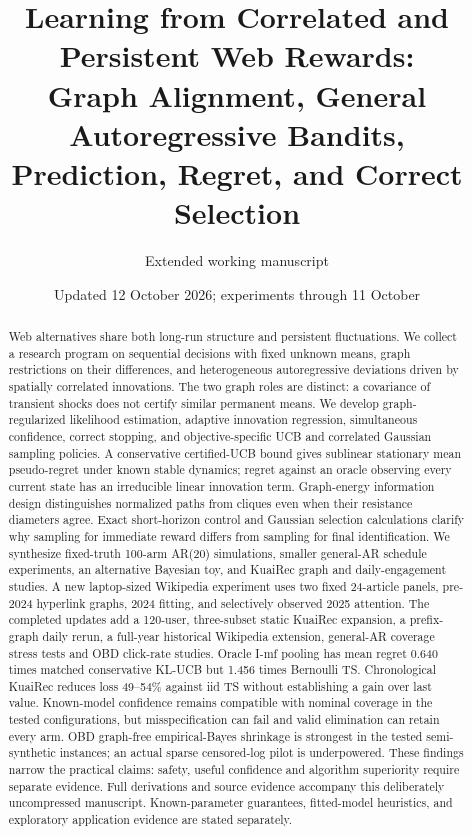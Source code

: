\documentclass[11pt]{article}
\title{Learning from Correlated and Persistent Web Rewards:\\Graph Alignment, General Autoregressive Bandits,\\Prediction, Regret, and Correct Selection}
\author{Extended working manuscript}
\date{Updated 12 October 2026; experiments through 11 October}
\begin{document}
\maketitle
\begin{abstract}
Web alternatives share both long-run structure and persistent fluctuations. We collect a research program on sequential decisions with fixed unknown means, graph restrictions on their differences, and heterogeneous autoregressive deviations driven by spatially correlated innovations. The two graph roles are distinct: a covariance of transient shocks does not certify similar permanent means. We develop graph-regularized likelihood estimation, adaptive innovation regression, simultaneous confidence, correct stopping, and objective-specific UCB and correlated Gaussian sampling policies. A conservative certified-UCB bound gives sublinear stationary mean pseudo-regret under known stable dynamics; regret against an oracle observing every current state has an irreducible linear innovation term. Graph-energy information design distinguishes normalized paths from cliques even when their resistance diameters agree. Exact short-horizon control and Gaussian selection calculations clarify why sampling for immediate reward differs from sampling for final identification. We synthesize fixed-truth 100-arm AR(20) simulations, smaller general-AR schedule experiments, an alternative Bayesian toy, and KuaiRec graph and daily-engagement studies. A new laptop-sized Wikipedia experiment uses two fixed 24-article panels, pre-2024 hyperlink graphs, 2024 fitting, and selectively observed 2025 attention.
The completed updates add a 120-user, three-subset static KuaiRec expansion, a prefix-graph daily rerun, a full-year historical Wikipedia extension, general-AR coverage stress tests and OBD click-rate studies. Oracle I-mf pooling has mean regret 0.640 times matched conservative KL-UCB but 1.456 times Bernoulli TS. Chronological KuaiRec reduces loss 49--54\% against iid TS without establishing a gain over last value. Known-model confidence remains compatible with nominal coverage in the tested configurations, but misspecification can fail and valid elimination can retain every arm. OBD graph-free empirical-Bayes shrinkage is strongest in the tested semi-synthetic instances; an actual sparse censored-log pilot is underpowered. These findings narrow the practical claims: safety, useful confidence and algorithm superiority require separate evidence.
Full derivations and source evidence accompany this deliberately uncompressed manuscript. Known-parameter guarantees, fitted-model heuristics, and exploratory application evidence are stated separately.
\end{abstract}
\clearpage
\tableofcontents
\clearpage

\clearpage
\appendix
\end{document}
